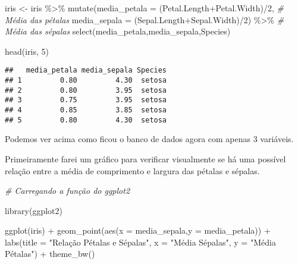 \documentclass[
]{book}
\newenvironment{Shaded}{\begin{snugshade}}{\end{snugshade}}
\newcommand{\AttributeTok}[1]{\textcolor[rgb]{0.77,0.63,0.00}{#1}}
\newcommand{\CommentTok}[1]{\textcolor[rgb]{0.56,0.35,0.01}{\textit{#1}}}
\newcommand{\DecValTok}[1]{\textcolor[rgb]{0.00,0.00,0.81}{#1}}
\newcommand{\FunctionTok}[1]{\textcolor[rgb]{0.00,0.00,0.00}{#1}}
\newcommand{\NormalTok}[1]{#1}
\newcommand{\OtherTok}[1]{\textcolor[rgb]{0.56,0.35,0.01}{#1}}
\newcommand{\SpecialCharTok}[1]{\textcolor[rgb]{0.00,0.00,0.00}{#1}}
\newcommand{\StringTok}[1]{\textcolor[rgb]{0.31,0.60,0.02}{#1}}
\begin{document}
\begin{Shaded}
\begin{Highlighting}[]
\NormalTok{iris }\OtherTok{\textless{}{-}}\NormalTok{ iris }\SpecialCharTok{\%\textgreater{}\%}
  \FunctionTok{mutate}\NormalTok{(}\AttributeTok{media\_petala =}\NormalTok{ (Petal.Length}\SpecialCharTok{+}\NormalTok{Petal.Width)}\SpecialCharTok{/}\DecValTok{2}\NormalTok{, }\CommentTok{\# Média das pétalas}
         \AttributeTok{media\_sepala =}\NormalTok{ (Sepal.Length}\SpecialCharTok{+}\NormalTok{Sepal.Width)}\SpecialCharTok{/}\DecValTok{2}\NormalTok{) }\SpecialCharTok{\%\textgreater{}\%} \CommentTok{\# Média das sépalas}
  \FunctionTok{select}\NormalTok{(media\_petala,media\_sepala,Species)}

\FunctionTok{head}\NormalTok{(iris, }\DecValTok{5}\NormalTok{)}
\end{Highlighting}
\end{Shaded}

\begin{verbatim}
##   media_petala media_sepala Species
## 1         0.80         4.30  setosa
## 2         0.80         3.95  setosa
## 3         0.75         3.95  setosa
## 4         0.85         3.85  setosa
## 5         0.80         4.30  setosa
\end{verbatim}

Podemos ver acima como ficou o banco de dados agora com apenas 3 variáveis.

Primeiramente farei um gráfico para verificar visualmente se há uma possível relação entre a média de comprimento e largura das pétalas e sépalas.

\begin{Shaded}
\begin{Highlighting}[]
\CommentTok{\# Carregando a função do ggplot2}

\FunctionTok{library}\NormalTok{(ggplot2)}

\FunctionTok{ggplot}\NormalTok{(iris) }\SpecialCharTok{+}
  \FunctionTok{geom\_point}\NormalTok{(}\FunctionTok{aes}\NormalTok{(}\AttributeTok{x =}\NormalTok{ media\_sepala,}\AttributeTok{y =}\NormalTok{ media\_petala)) }\SpecialCharTok{+}
  \FunctionTok{labs}\NormalTok{(}\AttributeTok{title =} \StringTok{"Relação Pétalas e Sépalas"}\NormalTok{,}
       \AttributeTok{x =} \StringTok{"Média Sépalas"}\NormalTok{,}
       \AttributeTok{y =} \StringTok{"Média Pétalas"}\NormalTok{) }\SpecialCharTok{+}
  \FunctionTok{theme\_bw}\NormalTok{()}
\end{Highlighting}
\end{Shaded}
\end{document}
